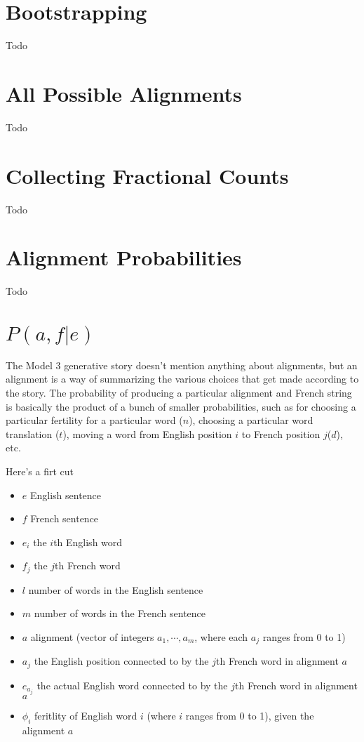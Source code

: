 \documentclass[a4paper]{article}
\begin{document}
\section{Bootstrapping}
Todo

\section{All Possible Alignments}
Todo

\section{Collecting Fractional Counts}
Todo

\section{Alignment Probabilities}
Todo

\section{$P(a,f|e)$}
The Model 3 generative story doesn't mention anything about alignments, but an alignment is a way of
summarizing the various choices that get made according to the story. The probability of producing a
particular alignment and French string is basically the product of a bunch of smaller probabilities, such as
for choosing a particular fertility for a particular word ($n$), choosing a particular word translation ($t$),
moving a word from English position $i$ to French position $j$($d$), etc.

Here's a firt cut
\begin{itemize}
    \item $e$ English sentence
    \item $f$ French sentence
    \item $e_i$ the $i$th English word
    \item $f_j$ the $j$th French word
    \item $l$ number of words in the English sentence
    \item $m$ number of words in the French sentence
    \item $a$ alignment (vector of integers $a_1, \cdots, a_m$, where each $a_j$ ranges from 0 to 1) 
    \item $a_j$ the English position connected to by the $j$th French word in alignment $a$
    \item $e_{a_j}$ the actual English word connected to by the $j$th French word in alignment $a$
    \item $\phi_i$ feritlity of English word $i$ (where $i$ ranges from 0 to 1), given the alignment $a$
\end{itemize}
\end{document}
